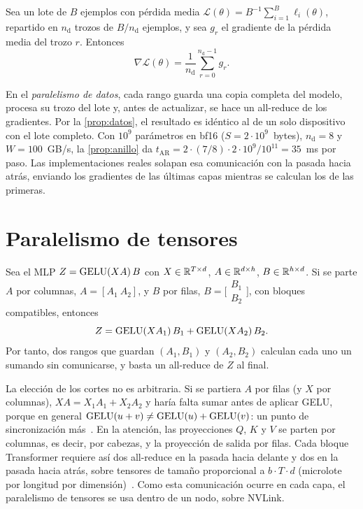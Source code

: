 \begin{proposicion}\label{prop:datos}
Sea un lote de $B$ ejemplos con pérdida media $\mathcal{L}(\theta)=B^{-1}\sum_{i=1}^{B}\ell_i(\theta)$, repartido en $n_{\mathrm{d}}$ trozos de $B/n_{\mathrm{d}}$ ejemplos, y sea $g_r$ el gradiente de la pérdida media del trozo $r$. Entonces
\[
\nabla\mathcal{L}(\theta)=\frac{1}{n_{\mathrm{d}}}\sum_{r=0}^{n_{\mathrm{d}}-1}g_r.
\]
\end{proposicion}

En el \emph{paralelismo de datos}, cada rango guarda una copia completa del modelo, procesa su trozo del lote y, antes de actualizar, se hace un all-reduce de los gradientes. Por la \cref{prop:datos}, el resultado es idéntico al de un solo dispositivo con el lote completo. Con $10^{9}$ parámetros en bf16 ($S=2\cdot 10^{9}$~bytes), $n_{\mathrm{d}}=8$ y $W=100$~GB/s, la \cref{prop:anillo} da $t_{\mathrm{AR}}=2\cdot(7/8)\cdot 2\cdot 10^{9}/10^{11}=35$~ms por paso. Las implementaciones reales solapan esa comunicación con la pasada hacia atrás, enviando los gradientes de las últimas capas mientras se calculan los de las primeras.

\section{Paralelismo de tensores}

\begin{proposicion}\label{prop:megatron}
Sea el MLP $Z=\operatorname{GELU}(XA)\,B$ con $X\in\mathbb{R}^{T\times d}$, $A\in\mathbb{R}^{d\times h}$, $B\in\mathbb{R}^{h\times d}$. Si se parte $A$ por columnas, $A=[A_1\ A_2]$, y $B$ por filas, $B=\bigl[\begin{smallmatrix}B_1\\ B_2\end{smallmatrix}\bigr]$, con bloques compatibles, entonces
\[
Z=\operatorname{GELU}(XA_1)\,B_1+\operatorname{GELU}(XA_2)\,B_2.
\]
Por tanto, dos rangos que guardan $(A_1,B_1)$ y $(A_2,B_2)$ calculan cada uno un sumando sin comunicarse, y basta un all-reduce de $Z$ al final.
\end{proposicion}

La elección de los cortes no es arbitraria. Si se partiera $A$ por filas (y $X$ por columnas), $XA=X_1A_1+X_2A_2$ y haría falta sumar antes de aplicar GELU, porque en general $\operatorname{GELU}(u+v)\ne\operatorname{GELU}(u)+\operatorname{GELU}(v)$: un punto de sincronización más~\cite[§3]{megatron}. En la atención, las proyecciones $Q$, $K$ y $V$ se parten por columnas, es decir, por cabezas, y la proyección de salida por filas. Cada bloque Transformer requiere así dos all-reduce en la pasada hacia delante y dos en la pasada hacia atrás, sobre tensores de tamaño proporcional a $b\cdot T\cdot d$ (microlote por longitud por dimensión)~\cite[§3.2]{narayanan}. Como esta comunicación ocurre en cada capa, el paralelismo de tensores se usa dentro de un nodo, sobre NVLink.

